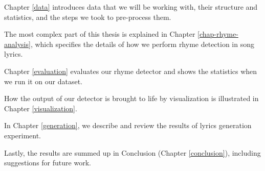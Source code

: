 Chapter \ref{data} introduces data that we will be working with, their structure and statistics, and the steps we took to pre-process them.

The most complex part of this thesis is explained in Chapter \ref{chap-rhyme-analysis}, which specifies the details of how we perform rhyme detection in song lyrics.

Chapter \ref{evaluation} evaluates our rhyme detector and shows the statistics when we run it on our dataset.

How the output of our detector is brought to life by visualization is illustrated in Chapter \ref{visualization}.

In Chapter \ref{generation}, we describe and review the results of lyrics generation experiment.

Lastly, the results are summed up in Conclusion (Chapter \ref{conclusion}), including suggestions for future work.
